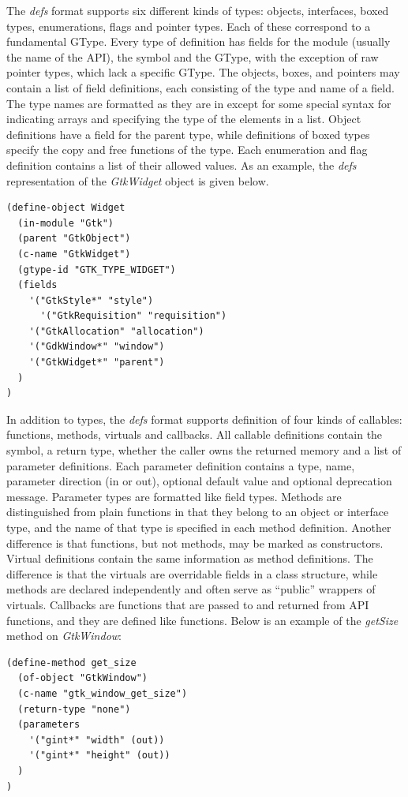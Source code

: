 \documentclass[article]{jss}
\begin{document}
The \emph{defs} format supports six different kinds of types: objects, 
interfaces, boxed types, enumerations, flags 
and pointer types. Each of these correspond to a fundamental GType. Every
type of definition has fields for the module (usually the name of the API),
the  symbol and the GType, with the exception of raw pointer types,
which lack a specific GType. The objects, boxes, and pointers may contain a 
list of field definitions, each consisting of the
type and name of a field. The type names are formatted as they are in 
except for some special syntax for indicating arrays and specifying the type
of the elements in a list. Object definitions have a field for the parent type, while 
definitions of boxed types specify the copy and free functions of the type.
Each enumeration and flag definition contains a list of their allowed values.
As an example, the \emph{defs} representation of the \emph{GtkWidget} object
is given below.
\begin{verbatim}
(define-object Widget
  (in-module "Gtk")
  (parent "GtkObject")
  (c-name "GtkWidget")
  (gtype-id "GTK_TYPE_WIDGET")
  (fields
    '("GtkStyle*" "style")
	  '("GtkRequisition" "requisition")
    '("GtkAllocation" "allocation")
    '("GdkWindow*" "window")
    '("GtkWidget*" "parent")
  )
)
\end{verbatim}

In addition to types, the \emph{defs} format supports definition of four kinds
of callables: functions, methods, virtuals and callbacks. All callable definitions
contain the  symbol, a return type, whether the caller
owns the returned memory and a list of 
parameter definitions. Each parameter definition contains a 
type, name, parameter direction (in or out), optional default value and optional
deprecation message. Parameter types are formatted like field types. Methods 
are distinguished from plain functions in that they belong to an object or 
interface type, and the name of that type is specified in each method definition.
Another difference is that functions, but not methods, may be marked as constructors.
Virtual definitions contain the same information as method definitions. The difference
is that the virtuals are overridable fields in a class structure, while methods are
declared independently and often serve as ``public'' wrappers of virtuals.
Callbacks are functions that are passed to and returned from API functions, 
and they are defined like functions. Below is an example of the \emph{getSize}
method on \emph{GtkWindow}:
\begin{verbatim}
(define-method get_size
  (of-object "GtkWindow")
  (c-name "gtk_window_get_size")
  (return-type "none")
  (parameters
    '("gint*" "width" (out))
    '("gint*" "height" (out))
  )
)
\end{verbatim}
\end{document}
